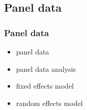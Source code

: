 
\subsection{Panel data}

\begin{frame}
	\frametitle{Panel data}
	\begin{itemize}
		\item panel data
		\item panel data analysis
		\item fixed effects model
		\item random effects model
	\end{itemize}
\end{frame}

